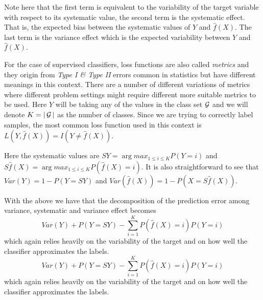Note here that the first term is equivalent to the variability of the target variable with respect to its systematic value, the second term is the systematic effect. That is, the expected bias between the systematic values of $Y$ and $\hat{f}(X)$. The last term is the variance effect which is the expected variability between $Y$ and $\hat{f}(X)$.





For the case of supervised classifiers, loss functions are also called \textit{metrics} and they origin from \textit{Type I \& Type II} errors common in statistics but have different meanings in this context.  There are a number of different variations of metrics where different problem settings might require different more suitable metrics to be used. Here $Y$ will be taking any of the values in the class set $\operatorname{\mathcal{G}}$ and we will denote $K = |\operatorname{\mathcal{G}}|$ as the number of classes. Since we are trying to correctly label samples, the most common loss function used in this context is $L(Y, \hat{f}(X)) = I(Y \neq \hat{f}(X))$.

Here the systematic values are  $SY = \arg max_{1\leq i \leq K} P(Y=i)$ and $S\hat{f}(X) = \arg max_{1\leq i \leq K} P(\hat{f}(X)=i)$. It is also straightforward to see that $Var(Y) = 1 - P(Y=SY)$ and $Var(\hat{f}(X)) = 1 -  P(X = S\hat{f}(X)) $.

With the above we have that the decomposition of the prediction error among variance, systematic and variance effect becomes
\begin{equation}
Var(Y) + P(Y=SY)  - \sum_{i=1}^K P(\hat{f}(X) =i)P(Y=i)	
\end{equation}
	 which again relies heavily on the variability of the target and on how well the classifier approximates the labels.
\begin{equation}
Var(Y) + P(Y=SY)  - \sum_{i=1}^K P(\hat{f}(X) =i)P(Y=i)
\end{equation} 
which again relies heavily on the variability of the target and on how well the classifier approximates the labels.

